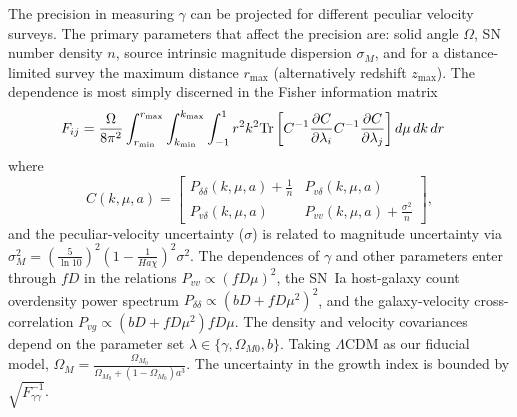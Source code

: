 The precision  in measuring $\gamma$ can be projected for different peculiar velocity surveys.
The primary  parameters that affect the precision are: solid angle $\Omega$, SN number density $n$, source intrinsic
magnitude dispersion $\sigma_M$, and for a distance-limited survey the maximum distance $r_{\text{max}}$ (alternatively redshift $z_{\text{max}}$).
The dependence is most simply discerned 
in the  Fisher information matrix
\begin{align}
F_{ij} 
& = \frac{\Omega}{8\pi^2} \int_{r_{\rm min}}^{r_{\rm max}}  \int_{k_{\rm min}}^{k_{\rm max}}  \int_{-1}^{1} r^2 k^2 \text{Tr}\left[ C^{-1} \frac{\partial C}{\partial \lambda_i} C^{-1}
\frac{\partial C}{\partial \lambda_j} \right] d\mu\,dk\,dr
\label{fisher:eqn}
\end{align}
where
\begin{equation}
C(k,\mu,a)  =
  \begin{bmatrix}
   P_{\delta \delta}(k,\mu,a) + \frac{1}{n} &
   P_{v\delta}(k,\mu,a)  \\
   P_{v\delta}(k,\mu,a)  &
  P_{vv}(k,\mu,a) + \frac{\sigma^2}{n}
   \end{bmatrix},
\label{cov:eq}
\end{equation}
and the
peculiar-velocity  uncertainty  ($\sigma$) is related to magnitude uncertainty via $\sigma_M^2 =  \left(\frac{5}{\ln{10}}\right)^2 \left(1-\frac{1}{Ha\chi}\right)^2 \sigma^2$.
The dependences of $\gamma$ and other parameters enter through $fD$ in the relations $P_{vv}\propto (fD\mu)^2$, the SN~Ia host-galaxy count overdensity
power spectrum $P_{\delta \delta }\propto (bD + fD\mu^2)^2$, and the galaxy-velocity cross-correlation $P_{vg}
\propto  (bD + fD\mu^2)fD\mu$.  
 The density and velocity covariances depend on the parameter set $\lambda \in \{\gamma, \Omega_{M0}, b\}$.
Taking $\Lambda$CDM as our fiducial model, 
$\Omega_M=\frac{\Omega_{M_0}}{\Omega_{M_0} + (1-\Omega_{M_0})a^3}$.  
The uncertainty in the growth index is bounded by $\sqrt{F^{-1}_{\gamma \gamma}}$.